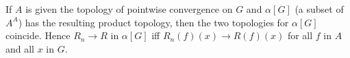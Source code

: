 If $A$ is given the topology of pointwise convergence on $G$ and $\alpha[G]$ (a subset of $A^A$) has the resulting product topology, then the two topologies for $\alpha[G]$ coincide. Hence $R_n \to R$ in $\alpha[G]$ iff $R_n(f)(x) \to R(f)(x)$ for all $f$ in $A$ and all $x$ in $G$.
